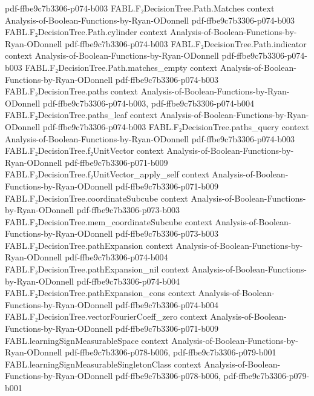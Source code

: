 \begin{theorem}
  {pdf-ffbe9c7b3306-p074-b003}
\proofstep
  {FABL.F₂DecisionTree.Path.Matches}
  {context}
  {Analysis-of-Boolean-Functions-by-Ryan-ODonnell}
  {pdf-ffbe9c7b3306-p074-b003}
\proofstep
  {FABL.F₂DecisionTree.Path.cylinder}
  {context}
  {Analysis-of-Boolean-Functions-by-Ryan-ODonnell}
  {pdf-ffbe9c7b3306-p074-b003}
\proofstep
  {FABL.F₂DecisionTree.Path.indicator}
  {context}
  {Analysis-of-Boolean-Functions-by-Ryan-ODonnell}
  {pdf-ffbe9c7b3306-p074-b003}
\proofstep
  {FABL.F₂DecisionTree.Path.matches_empty}
  {context}
  {Analysis-of-Boolean-Functions-by-Ryan-ODonnell}
  {pdf-ffbe9c7b3306-p074-b003}
\proofstep
  {FABL.F₂DecisionTree.paths}
  {context}
  {Analysis-of-Boolean-Functions-by-Ryan-ODonnell}
  {pdf-ffbe9c7b3306-p074-b003,
    pdf-ffbe9c7b3306-p074-b004}
\proofstep
  {FABL.F₂DecisionTree.paths_leaf}
  {context}
  {Analysis-of-Boolean-Functions-by-Ryan-ODonnell}
  {pdf-ffbe9c7b3306-p074-b003}
\proofstep
  {FABL.F₂DecisionTree.paths_query}
  {context}
  {Analysis-of-Boolean-Functions-by-Ryan-ODonnell}
  {pdf-ffbe9c7b3306-p074-b003}
\proofstep
  {FABL.F₂DecisionTree.f₂UnitVector}
  {context}
  {Analysis-of-Boolean-Functions-by-Ryan-ODonnell}
  {pdf-ffbe9c7b3306-p071-b009}
\proofstep
  {FABL.F₂DecisionTree.f₂UnitVector_apply_self}
  {context}
  {Analysis-of-Boolean-Functions-by-Ryan-ODonnell}
  {pdf-ffbe9c7b3306-p071-b009}
\proofstep
  {FABL.F₂DecisionTree.coordinateSubcube}
  {context}
  {Analysis-of-Boolean-Functions-by-Ryan-ODonnell}
  {pdf-ffbe9c7b3306-p073-b003}
\proofstep
  {FABL.F₂DecisionTree.mem_coordinateSubcube}
  {context}
  {Analysis-of-Boolean-Functions-by-Ryan-ODonnell}
  {pdf-ffbe9c7b3306-p073-b003}
\proofstep
  {FABL.F₂DecisionTree.pathExpansion}
  {context}
  {Analysis-of-Boolean-Functions-by-Ryan-ODonnell}
  {pdf-ffbe9c7b3306-p074-b004}
\proofstep
  {FABL.F₂DecisionTree.pathExpansion_nil}
  {context}
  {Analysis-of-Boolean-Functions-by-Ryan-ODonnell}
  {pdf-ffbe9c7b3306-p074-b004}
\proofstep
  {FABL.F₂DecisionTree.pathExpansion_cons}
  {context}
  {Analysis-of-Boolean-Functions-by-Ryan-ODonnell}
  {pdf-ffbe9c7b3306-p074-b004}
\proofstep
  {FABL.F₂DecisionTree.vectorFourierCoeff_zero}
  {context}
  {Analysis-of-Boolean-Functions-by-Ryan-ODonnell}
  {pdf-ffbe9c7b3306-p071-b009}
\proofstep
  {FABL.learningSignMeasurableSpace}
  {context}
  {Analysis-of-Boolean-Functions-by-Ryan-ODonnell}
  {pdf-ffbe9c7b3306-p078-b006,
    pdf-ffbe9c7b3306-p079-b001}
\proofstep
  {FABL.learningSignMeasurableSingletonClass}
  {context}
  {Analysis-of-Boolean-Functions-by-Ryan-ODonnell}
  {pdf-ffbe9c7b3306-p078-b006,
    pdf-ffbe9c7b3306-p079-b001}
\proofstep

\end{theorem}
